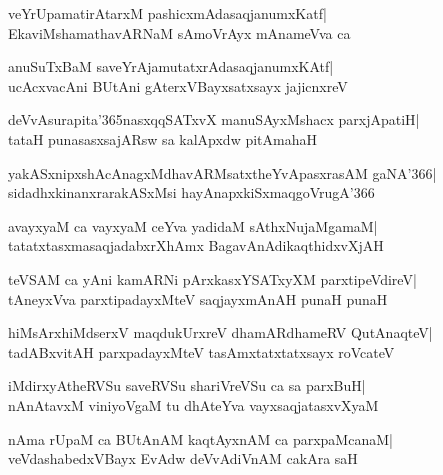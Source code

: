 \documentclass[twoside,12pt,openright]{book}
\newcounter{shloka}[chapter]
\begin{document}
\begin{shloka}%
veYrUpamatirAtarxM pashicxmAdasaqjanumxKatf|\\
EkaviMshamathavARNaM sAmoVrAyx mAnameVva ca
\end{shloka}

\begin{shloka}%
anuSuTxBaM saveYrAjamutatxrAdasaqjanumxKAtf|\\
ucAcxvacAni BUtAni gAterxVBayxsatxsayx jajicnxreV
\end{shloka}

\begin{shloka}%
deVvAsurapita\char'365nasxqqSATxvX manuSAyxMshacx parxjApatiH|\\
tataH punasasxsajARsw sa kalApxdw pitAmahaH
\end{shloka}

\begin{shloka}%
yakASxnipxshAcAnagxMdhavARMsatxtheYvApasxrasAM gaNA\char'366|\\
sidadhxkinanxrarakASxMsi hayAnapxkiSxmaqgoVrugA\char'366
\end{shloka}

\begin{shloka}%
avayxyaM ca vayxyaM ceYva yadidaM sAthxNujaMgamaM|\\
tatatxtasxmasaqjadabxrXhAmx BagavAnAdikaqthidxvXjAH
\end{shloka}

\begin{shloka}%
teVSAM ca yAni kamARNi pArxkasxYSATxyXM parxtipeVdireV|\\
tAneyxVva parxtipadayxMteV saqjayxmAnAH punaH punaH
\end{shloka}

\begin{shloka}%
hiMsArxhiMdserxV maqdukUrxreV dhamARdhameRV QutAnaqteV|\\
tadABxvitAH parxpadayxMteV tasAmxtatxtatxsayx roVcateV
\end{shloka}

\begin{shloka}%
iMdirxyAtheRVSu saveRVSu shariVreVSu ca sa parxBuH|\\
nAnAtavxM viniyoVgaM tu dhAteYva vayxsaqjatasxvXyaM
\end{shloka}

\begin{shloka}%
nAma rUpaM ca BUtAnAM kaqtAyxnAM ca parxpaMcanaM|\\
veVdashabedxVBayx EvAdw deVvAdiVnAM cakAra saH
\end{shloka}
\end{document}
